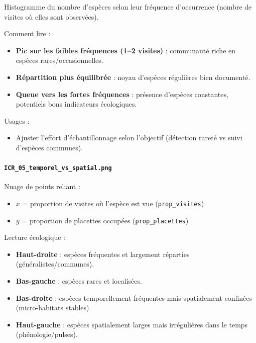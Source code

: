 Histogramme du nombre d'espèces selon leur fréquence d'occurrence
(nombre de visites où elles sont observées).

Comment lire :

\begin{itemize}
\tightlist
\item
  \textbf{Pic sur les faibles fréquences (1--2 visites)} : communauté
  riche en espèces rares/occasionnelles.
\item
  \textbf{Répartition plus équilibrée} : noyau d'espèces régulières bien
  documenté.
\item
  \textbf{Queue vers les fortes fréquences} : présence d'espèces
  constantes, potentiels bons indicateurs écologiques.
\end{itemize}

Usages :

\begin{itemize}
\tightlist
\item
  Ajuster l'effort d'échantillonnage selon l'objectif (détection rareté
  vs suivi d'espèces communes).
\end{itemize}

\paragraph{\texorpdfstring{\texttt{ICR\_05\_temporel\_vs\_spatial.png}}{ICR\_05\_temporel\_vs\_spatial.png}}\label{icr_05_temporel_vs_spatial.png}

Nuage de points reliant :

\begin{itemize}
\tightlist
\item
  \(x\) = proportion de visites où l'espèce est vue
  (\texttt{prop\_visites})
\item
  \(y\) = proportion de placettes occupées (\texttt{prop\_placettes})
\end{itemize}

Lecture écologique :

\begin{itemize}
\tightlist
\item
  \textbf{Haut-droite} : espèces fréquentes et largement réparties
  (généralistes/communes).
\item
  \textbf{Bas-gauche} : espèces rares et localisées.
\item
  \textbf{Bas-droite} : espèces temporellement fréquentes mais
  spatialement confinées (micro-habitats stables).
\item
  \textbf{Haut-gauche} : espèces spatialement larges mais irrégulières
  dans le temps (phénologie/pulses).
\end{itemize}

